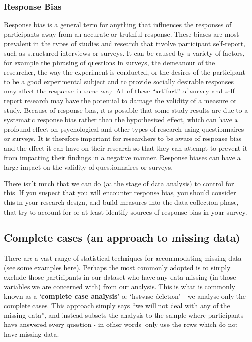 \documentclass[
]{book}
\begin{document}
\hypertarget{response-bias}{%
\subsubsection{Response Bias}\label{response-bias}}

Response bias is a general term for anything that influences the responses of participants away from an accurate or truthful response. These biases are most prevalent in the types of studies and research that involve participant self-report, such as structured interviews or surveys. It can be caused by a variety of factors, for example the phrasing of questions in surveys, the demeanour of the researcher, the way the experiment is conducted, or the desires of the participant to be a good experimental subject and to provide socially desirable responses may affect the response in some way. All of these ``artifact'' of survey and self-report research may have the potential to damage the validity of a measure or study. Because of response bias, it is possible that some study results are due to a systematic response bias rather than the hypothesized effect, which can have a profound effect on psychological and other types of research using questionnaires or surveys. It is therefore important for researchers to be aware of response bias and the effect it can have on their research so that they can attempt to prevent it from impacting their findings in a negative manner. Response biases can have a large impact on the validity of questionnaires or surveys.

There isn't much that we can do (at the stage of data analysis) to control for this. If you suspect that you will encounter response bias, you should consider this in your research design, and build measures into the data collection phase, that try to account for or at least identify sources of response bias in your survey.

\hypertarget{complete-cases-an-approach-to-missing-data}{%
\subsection{Complete cases (an approach to missing data)}\label{complete-cases-an-approach-to-missing-data}}

There are a vast range of statistical techniques for accommodating missing data (see some examples \href{https://www.lshtm.ac.uk/research/centres-projects-groups/missing-data}{here}). Perhaps the most commonly adopted is to simply exclude those participants in our dataset who have any data missing (in those variables we are concerned with) from our analysis. This is what is commonly known as a `\textbf{complete case analysis}' or `listwise deletion' - we analyse only the complete cases. This approach simply says ``we will not deal with any of the missing data'', and instead subsets the analysis to the sample where participants have answered every question - in other words, only use the rows which do not have missing data.
\end{document}
